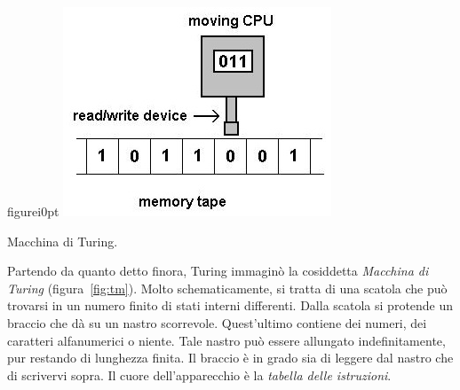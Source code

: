 \begin{wrapfloat}{figure}{i}{0pt}
	\centering
	\includegraphics[width=0.5\columnwidth]{immagini/turing}
	\caption{Macchina di Turing.}
	\label{fig:tm}
\end{wrapfloat}
Partendo  da quanto detto finora, Turing immaginò la cosiddetta \emph{Macchina di Turing} (figura~\ref{fig:tm}).
Molto schematicamente, si tratta di una scatola che può trovarsi in un numero finito di stati interni differenti.
Dalla scatola si protende un braccio che dà su un nastro scorrevole.
Quest'ultimo contiene dei numeri, dei caratteri alfanumerici o niente. Tale nastro può essere allungato indefinitamente, pur restando di lunghezza finita.
Il braccio è in grado sia di leggere dal nastro che di scrivervi sopra.
Il cuore dell'apparecchio è la \emph{tabella delle istruzioni}.

